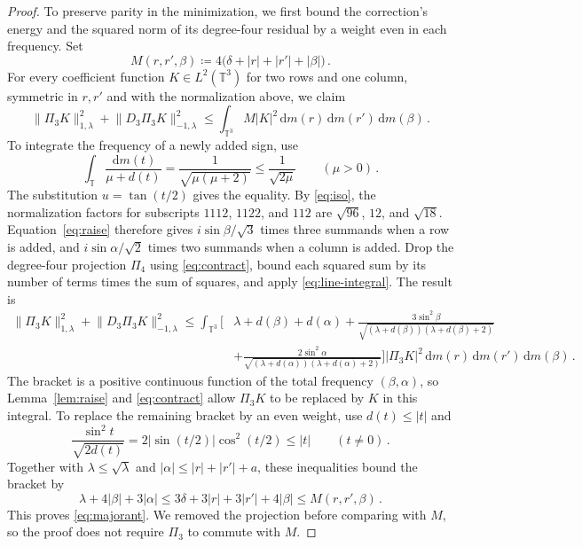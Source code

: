 \documentclass[11pt]{amsart}
\theoremstyle{plain}
\theoremstyle{definition}
\newcommand{\T}{\mathbb T}
\newcommand{\1}{\mathbf 1}
\newcommand{\norm}[1]{\lVert #1\rVert}
\newcommand{\abs}[1]{\lvert #1\rvert}
\newcommand{\dd}{\,\mathrm d}
\newcommand{\Hminus}[1]{\norm{#1}_{-1,\lambda}}
\newcommand{\Hplus}[1]{\norm{#1}_{1,\lambda}}
\begin{document}
\begin{proof}
To preserve parity in the minimization, we first bound the correction's
energy and the squared norm of its degree-four residual by a weight even
in each frequency.
Set
\begin{equation}\label{eq:M}
  M(r,r',\beta)\coloneqq
  4\bigl(\delta+\abs r+\abs{r'}+\abs\beta\bigr)\, .
\end{equation}
For every coefficient function $K\in L^2(\T^3)$ for two rows and one column,
symmetric in $r,r'$ and with the normalization above, we claim
\begin{equation}\label{eq:majorant}
  \Hplus{\Pi_3K}^2+\Hminus{D_3\Pi_3K}^2
  \leq\int_{\T^3}M\abs K^2
  \dd m(r)\dd m(r')\dd m(\beta)\, .
\end{equation}
To integrate the frequency of a newly added sign, use
\begin{equation}\label{eq:line-integral}
  \int_\T\frac{\dd m(t)}{\mu+d(t)}
  =\frac1{\sqrt{\mu(\mu+2)}}\leq\frac1{\sqrt{2\mu}}
  \qquad(\mu>0)\, .
\end{equation}
The substitution $u=\tan(t/2)$ gives the equality.
By \eqref{eq:iso}, the normalization factors for subscripts $1112$, $1122$,
and $112$ are $\sqrt{96}$, $12$, and $\sqrt{18}$.
Equation~\eqref{eq:raise} therefore gives $i\sin\beta/\sqrt3$ times
three summands when a row is added, and $i\sin\alpha/\sqrt2$ times
two summands when a column is added.
Drop the degree-four projection $\Pi_4$ using \eqref{eq:contract}, bound each squared
sum by its number of terms times the sum of squares, and apply
\eqref{eq:line-integral}.  The result is
\begin{align*}
  \Hplus{\Pi_3K}^2+\Hminus{D_3\Pi_3K}^2
  \leq\int_{\T^3}\Biggl[&\lambda+d(\beta)+d(\alpha)
  +\frac{3\sin^2\beta}
  {\sqrt{(\lambda+d(\beta))(\lambda+d(\beta)+2)}}\\
  &+\frac{2\sin^2\alpha}
  {\sqrt{(\lambda+d(\alpha))(\lambda+d(\alpha)+2)}}\Biggr]
  \abs{\Pi_3K}^2\dd m(r)\dd m(r')\dd m(\beta)\, .
\end{align*}
The bracket is a positive continuous function of the total frequency
$(\beta,\alpha)$, so Lemma~\ref{lem:raise} and \eqref{eq:contract}
allow $\Pi_3K$ to be replaced by $K$ in this integral.
To replace the remaining bracket by an even weight, use
$d(t)\leq\abs t$ and
\[
  \frac{\sin^2t}{\sqrt{2d(t)}}
  =2\abs{\sin(t/2)}\cos^2(t/2)\leq\abs t
  \qquad(t\ne0)\, .
\]
Together with $\lambda\leq\sqrt\lambda$ and
$\abs\alpha\leq\abs r+\abs{r'}+a$, these inequalities bound the bracket by
\[
  \lambda+4\abs\beta+3\abs\alpha
  \leq3\delta+3\abs r+3\abs{r'}+4\abs\beta
  \leq M(r,r',\beta)\, .
\]
This proves \eqref{eq:majorant}.  We removed the projection before
comparing with $M$, so the proof does not require $\Pi_3$ to commute with $M$.


\end{proof}
\end{document}
